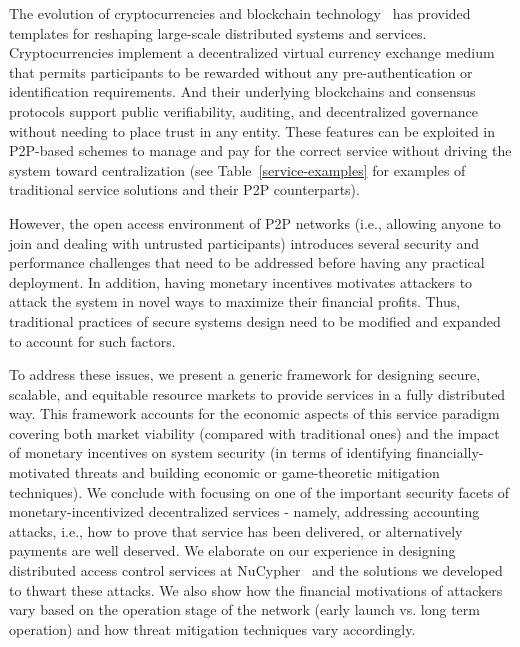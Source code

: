 \documentclass{llncs}
\begin{document}
The evolution of cryptocurrencies and blockchain technology~\cite{bitcoin,ethereum} has provided templates for reshaping large-scale distributed systems and services. Cryptocurrencies implement a decentralized virtual currency exchange medium that permits participants to be rewarded without any pre-authentication or identification requirements. And their underlying blockchains and consensus protocols support public verifiability, auditing, and decentralized governance without needing to place trust in any entity. These features can be exploited in P2P-based schemes to manage and pay for the correct service without driving the system toward centralization (see Table~\ref{service-examples} for examples of traditional service solutions and their P2P counterparts).


However, the open access environment of P2P networks (i.e., allowing anyone to join and dealing with untrusted participants) introduces several security and performance challenges that need to be addressed before having any practical deployment. In addition, having monetary incentives motivates attackers to attack the system in novel ways to maximize their financial profits. Thus, traditional practices of secure systems design need to be modified and expanded to account for such factors. 


To address these issues, we present a generic framework for designing secure, scalable, and equitable resource markets to provide services in a fully distributed way. This framework accounts for the economic aspects of this service paradigm covering both market viability (compared with traditional ones) and the impact of monetary incentives on system security (in terms of identifying financially-motivated threats and building economic or game-theoretic mitigation techniques). We conclude with focusing on one of the important security facets of monetary-incentivized decentralized services - namely, addressing accounting attacks, i.e., how to prove that service has been delivered, or alternatively payments are well deserved. We elaborate on our experience in designing distributed access control services at NuCypher~\cite{nucypher} and the solutions we developed to thwart these attacks. We also show how the financial motivations of attackers vary based on the operation stage of the network (early launch vs. long term operation) and how threat mitigation techniques vary accordingly.
\end{document}
